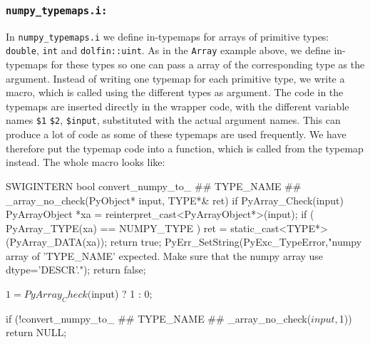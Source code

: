 \begin{code}
\subsubsection{\texttt{numpy\_typemaps.i:}}
In \texttt{numpy\_typemaps.i} we define in-typemaps for arrays of primitive types: \texttt{double}, \texttt{int} and \texttt{dolfin::uint}. As in the \texttt{Array} example above, we define in-typemaps for these types so one can pass a \numpy array of the corresponding type as the argument. Instead of writing one typemap for each primitive type, we write a \swig macro, which is called using the different types as argument. The code in the typemaps are inserted directly in the wrapper code, with the different variable names \texttt{\$1} \texttt{\$2}, \texttt{\$input}, substituted with the actual argument names. This can produce a lot of code as some of these typemaps are used frequently. We have therefore put the typemap code into a function, which is called from the typemap instead. The whole macro looks like:
\begin{code}
SWIGINTERN bool convert_numpy_to_ ## TYPE_NAME ## _array_no_check(PyObject* input, TYPE*& ret)
{
  if PyArray_Check(input) 
  {
    PyArrayObject *xa = reinterpret_cast<PyArrayObject*>(input);
    if ( PyArray_TYPE(xa) == NUMPY_TYPE )
    {
      ret  = static_cast<TYPE*>(PyArray_DATA(xa));
      return true;
    }
  }
  PyErr_SetString(PyExc_TypeError,"numpy array of 'TYPE_NAME' expected. Make sure that the numpy array use dtype='DESCR'.");
  return false;
}

{
    $1 = PyArray_Check($input) ? 1 : 0;
}

{
if (!convert_numpy_to_ ## TYPE_NAME ## _array_no_check($input,$1))
    return NULL;
}


\end{code}
\end{code}
